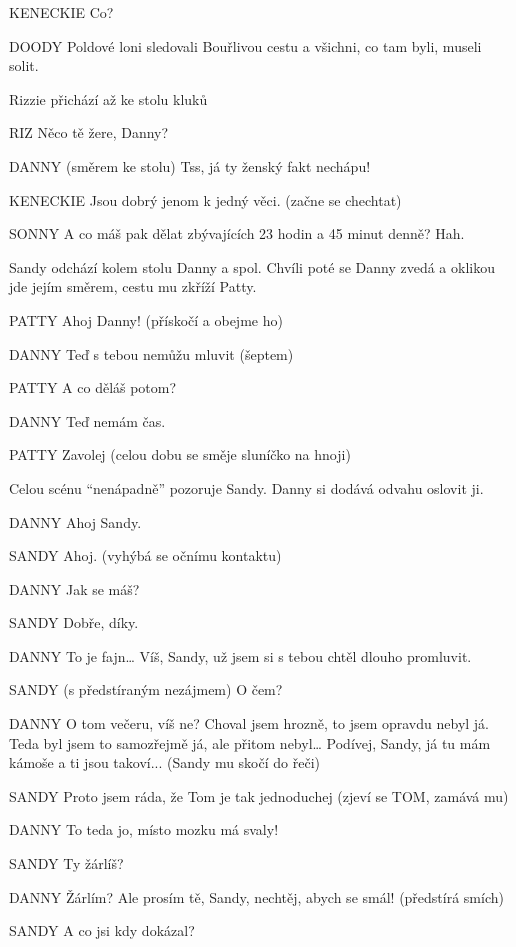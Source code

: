 KENECKIE        Co? 

DOODY         Poldové loni sledovali Bouřlivou cestu a všichni, co tam byli, museli solit. 

Rizzie přichází až ke stolu kluků 

RIZ         Něco tě žere, Danny? 

DANNY        (směrem ke stolu) Tss, já ty ženský fakt nechápu! 

KENECKIE        Jsou dobrý jenom k jedný věci. (začne se chechtat) 

SONNY         A co máš pak dělat zbývajících 23 hodin a 45 minut denně? Hah. 

Sandy odchází kolem stolu Danny a spol. Chvíli poté se Danny zvedá a oklikou jde jejím směrem, cestu mu zkříží Patty. 

PATTY        Ahoj Danny! (přískočí a obejme ho) 

DANNY        Teď s tebou nemůžu mluvit (šeptem) 

PATTY         A co děláš potom? 

DANNY         Teď nemám čas.

PATTY         Zavolej (celou dobu se směje sluníčko na hnoji) 

Celou scénu “nenápadně” pozoruje Sandy. Danny si dodává odvahu oslovit ji. 

DANNY         Ahoj Sandy.

SANDY        Ahoj. (vyhýbá se očnímu kontaktu) 

DANNY        Jak se máš? 

SANDY        Dobře, díky. 

DANNY        To je fajn… Víš, Sandy, už jsem si s tebou chtěl dlouho promluvit. 

SANDY         (s předstíraným nezájmem) O čem? 

DANNY         O tom večeru, víš ne? Choval jsem hrozně, to jsem opravdu nebyl já.         Teda byl jsem to samozřejmě já, ale přitom nebyl… Podívej, Sandy, já tu         mám kámoše a ti jsou takoví... (Sandy mu skočí do řeči) 

SANDY        Proto jsem ráda, že Tom je tak jednoduchej (zjeví se TOM, zamává  mu) 

DANNY         To teda jo, místo mozku má svaly! 

SANDY         Ty žárlíš? 

DANNY        Žárlím? Ale prosím tě, Sandy, nechtěj, abych se smál! (předstírá smích) 

SANDY         A co jsi kdy dokázal? 

